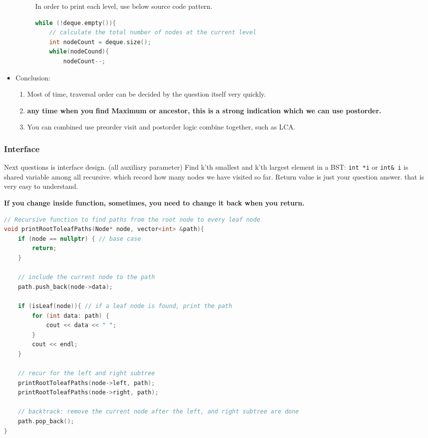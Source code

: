 \documentclass[a4paper,11pt,twoside]{book}
\begin{document}
\begin{itemize}
\begin{description}
	\item[] In order to print each level, use below source code pattern.
\begin{lstlisting}[frame=single, language=c++]
while (!deque.empty()){
	// calculate the total number of nodes at the current level
	int nodeCount = deque.size();	
	while(nodeCound){
		nodeCount--;
\end{lstlisting}	

\end{description}


\item Conclusion: 
\begin{enumerate}
	\item Most of time, traversal order can be decided by the question itself very quickly.
	
	\item \textbf{any time when you find Maximum or ancestor, this is a strong indication which we can use postorder.}
	
	\item You can combined use preorder visit and postorder logic combine together, such as LCA. 
\end{enumerate}

\end{itemize}



\subsubsection{Interface}


	\par Next questions is interface design. (all auxiliary parameter) Find k’th smallest and k’th largest element in a BST:  \texttt{int *i} or \texttt{int\& i} is shared variable among all recursive. which record how many nodes we have visited so far. Return value is just your question answer. that is very easy to understand. 
	

	\par \textbf{If you change inside function, sometimes, you need to change it back when you return.}
\begin{lstlisting}[frame=single, language=c++]
// Recursive function to find paths from the root node to every leaf node
void printRootToleafPaths(Node* node, vector<int> &path){
	if (node == nullptr) { // base case
		return;
	}
	
	// include the current node to the path
	path.push_back(node->data);
	
	if (isLeaf(node)){ // if a leaf node is found, print the path
		for (int data: path) {
			cout << data << " ";
		}
		cout << endl;
	}
	
	// recur for the left and right subtree
	printRootToleafPaths(node->left, path);
	printRootToleafPaths(node->right, path);
	
	// backtrack: remove the current node after the left, and right subtree are done
	path.pop_back();
}	
\end{lstlisting}
\end{document}
